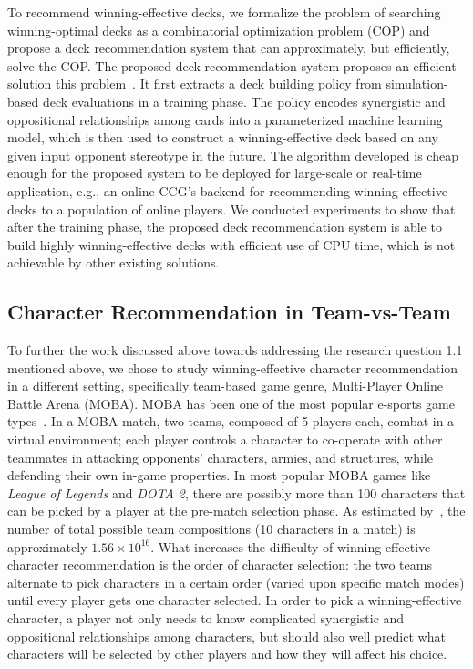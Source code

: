 To recommend winning-effective decks, we formalize the problem of searching winning-optimal decks as a combinatorial optimization problem (COP) and propose a deck recommendation system that can approximately, but efficiently, solve the COP. The proposed deck recommendation system proposes an efficient solution this problem~\cite{chenqdeckrec}. It first extracts a deck building policy from simulation-based deck evaluations in a training phase. The policy encodes synergistic and oppositional relationships among cards into a parameterized machine learning model, which is then used to construct a winning-effective deck based on any given input opponent stereotype in the future. The algorithm developed is cheap enough for the proposed system to be deployed for large-scale or real-time application, e.g., an online CCG's backend for recommending winning-effective decks to a population of online players. We conducted experiments to show that after the training phase, the proposed deck recommendation system is able to build highly winning-effective decks with efficient use of CPU time, which is not achievable by other existing solutions. 



\subsection{Character Recommendation in Team-vs-Team}\label{sec:thesis_overview:character_recom}

To further the work discussed above towards addressing the research question 1.1 mentioned above, we chose to study winning-effective character recommendation in a different setting, specifically team-based game genre, Multi-Player Online Battle Arena (MOBA). MOBA has been one of the most popular e-sports game types~\cite{superdata2016}. In a MOBA match, two teams, composed of 5 players each, combat in a virtual environment; each player controls a character to co-operate with other teammates in attacking opponents' characters, armies, and structures, while defending their own in-game properties. In most popular MOBA games like \textit{League of Legends} and \textit{DOTA 2}, there are possibly more than 100 characters that can be picked by a player at the pre-match selection phase. As estimated by~\cite{hanke2017reco}, the number of total possible team compositions (10 characters in a match) is approximately $1.56 \times 10^{16}$. What increases the difficulty of winning-effective character recommendation is the order of character selection: the two teams alternate to pick characters in a certain order (varied upon specific match modes) until every player gets one character selected. In order to pick a winning-effective character, a player not only needs to know complicated synergistic and oppositional relationships among characters, but should also well predict what characters will be selected by other players and how they will affect his choice. 

